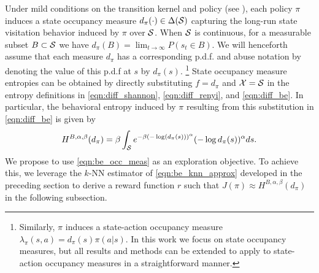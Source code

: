 Under mild conditions on the transition kernel and policy (see \citep{puterman2014markov}), each policy $\pi$ induces a state occupancy measure $d_{\pi}(\cdot) \in \Delta(\mathcal{S})$ capturing the long-run state visitation behavior induced by $\pi$ over $\mathcal{S}$.
%
When $\mathcal{S}$ is continuous, for a measurable subset $B \subset \mathcal{S}$ we have $d_{\pi}(B) = \lim_{t \rightarrow \infty} P(s_t \in B)$.
%
We will henceforth assume that each measure $d_{\pi}$ has a corresponding p.d.f. and abuse notation by denoting the value of this p.d.f at $s$ by $d_{\pi}(s)$.
%
\footnote{Similarly, $\pi$ induces a state-action occupancy measure $\lambda_{\pi}(s, a) = d_{\pi}(s) \pi(a | s)$. In this work we focus on state occupancy measures, but all results and methods can be extended to apply to state-action occupancy measures in a straightforward manner.}
%
State occupancy measure entropies can be obtained by directly substituting $f = d_{\pi}$ and $\mathcal{X} = \mathcal{S}$ in the entropy definitions in \eqref{eqn:diff_shannon}, \eqref{eqn:diff_renyi}, and \eqref{eqn:diff_be}. In particular, the behavioral entropy induced by $\pi$ resulting from this substitution in \eqref{eqn:diff_be} is given by
%
\begin{equation} \label{eqn:be_occ_meas}
    H^{B,\alpha,\beta}(d_{\pi}) = \beta \int_{\mathcal{S}} e^{-\beta (-\log(d_{\pi}(s)))^\alpha} (-\log d_{\pi}(s))^{\alpha} ds.
\end{equation}
%
We propose to use \eqref{eqn:be_occ_meas} as an exploration objective. To achieve this, we leverage the $k$-NN estimator of \eqref{eqn:be_knn_approx} developed in the preceding section to derive a reward function $r$ such that $J(\pi) \approx H^{B,\alpha,\beta}(d_{\pi})$ in the following subsection.



